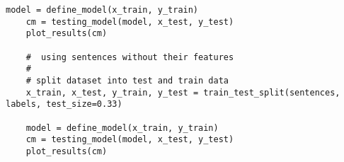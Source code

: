 \begin{lstlisting}[language=iPython]
	model = define_model(x_train, y_train)
	cm = testing_model(model, x_test, y_test)
	plot_results(cm)
	
	#  using sentences without their features
	#
	# split dataset into test and train data
	x_train, x_test, y_train, y_test = train_test_split(sentences, labels, test_size=0.33)
	
	model = define_model(x_train, y_train)
	cm = testing_model(model, x_test, y_test)
	plot_results(cm)

\end{lstlisting}
